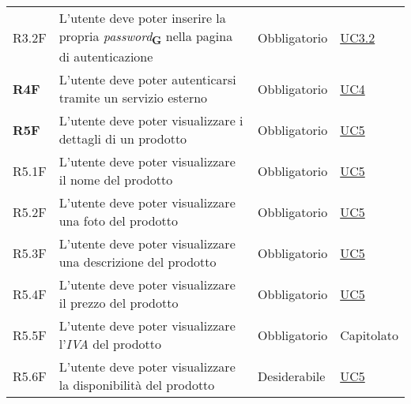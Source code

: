 \begin{center}
\begin{longtable}[!h]{p{50px} p{245px} p{75px} p{50px}}
        R3.2F                                 & L'utente deve poter inserire la propria \textit{password}\textsubscript{\textbf{G}} nella pagina di autenticazione                 & Obbligatorio             & \hyperref[sec:UC3.2]{UC3.2}                  \\
        \textbf{R4F}                          & L'utente deve poter autenticarsi tramite un servizio esterno                                                                       & Obbligatorio             & \hyperref[sec:UC4]{UC4}                      \\
        \textbf{R5F}                          & L'utente deve poter visualizzare i dettagli di un prodotto                                                                         & Obbligatorio             & \hyperref[sec:UC5]{UC5}                      \\
        R5.1F                                 & L'utente deve poter visualizzare il nome del prodotto                                                                              & Obbligatorio             & \hyperref[sec:UC5]{UC5}                      \\
        R5.2F                                 & L'utente deve poter visualizzare una foto del prodotto                                                                             & Obbligatorio             & \hyperref[sec:UC5]{UC5}                      \\
        R5.3F                                 & L'utente deve poter visualizzare una descrizione del prodotto                                                                      & Obbligatorio             & \hyperref[sec:UC5]{UC5}                      \\
        R5.4F                                 & L'utente deve poter visualizzare il prezzo del prodotto                                                                            & Obbligatorio             & \hyperref[sec:UC5]{UC5}                      \\
        R5.5F                                 & L'utente deve poter visualizzare l'\textit{IVA} del prodotto                                                                       & Obbligatorio             & Capitolato                                   \\
        R5.6F                                 & L'utente deve poter visualizzare la disponibilità del prodotto                                                                     & Desiderabile             & \hyperref[sec:UC5]{UC5}                      \\

\end{longtable}
\end{center}
